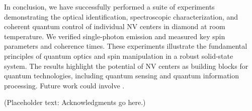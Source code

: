 \documentclass[aps,prb,twocolumn,superscriptaddress,floatfix,longbibliography,citeautoscript]{revtex4-2}
\begin{document}
In conclusion, we have successfully performed a suite of experiments demonstrating the optical identification, spectroscopic characterization, and coherent quantum control of individual NV centers in diamond at room temperature.
We verified single-photon emission and measured key spin parameters and coherence times.
These experiments illustrate the fundamental principles of quantum optics and spin manipulation in a robust solid-state system.
The results highlight the potential of NV centers as building blocks for quantum technologies, including quantum sensing and quantum information processing.
Future work could involve .

\begin{acknowledgments}

(Placeholder text: Acknowledgments go here.)
\end{acknowledgments}



\end{document}
